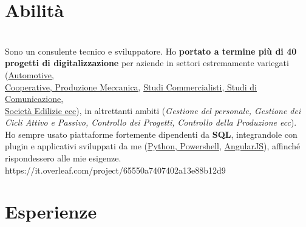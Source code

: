 \documentclass[letterpaper]{twentysecondcv} %
\begin{document}

\makeprofile %


\section{Abilità}
\\Sono un consulente tecnico e sviluppatore.
Ho \textbf{portato a termine più di 40 progetti di digitalizzazione} per aziende in settori estremamente variegati (\underline{Automotive,}  \\\underline{Cooperative, Produzione Meccanica,} \underline{Studi Commercialisti, Studi di Comunicazione,} \\\underline{Società Edilizie ecc}), in altrettanti ambiti (\textit{Gestione del personale, Gestione dei Cicli Attivo e Passivo, Controllo dei Progetti,}\textit{ Controllo della Produzione ecc}).\\
Ho sempre usato piattaforme fortemente dipendenti da \textbf{SQL}, integrandole con plugin e applicativi sviluppati da me (\underline{Python, Powershell,} \underline{AngularJS}), affinché rispondessero alle mie esigenze.
https://it.overleaf.com/project/65550a7407402a13e88b12d9

\section{Esperienze}

\begin{twenty} %
\end{twenty}
\end{document}

